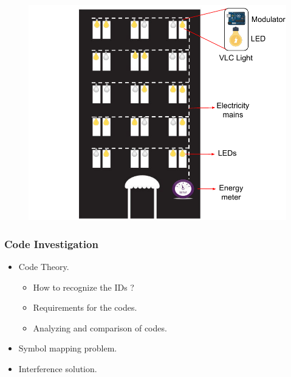 \documentclass{beamer}
\begin{document}
\begin{frame}
\begin{minipage}{.5\linewidth}
\begin{enumerate}
			\end{enumerate}
		\end{minipage}%
		\begin{minipage}{.5\linewidth}
			\begin{figure}
				\includegraphics[width=1.05\textwidth]{design.pdf}
			\end{figure}
		\end{minipage}

	\end{frame}



	\begin{frame}\frametitle{Code Investigation}

		\begin{itemize}

			\item Code Theory.
			\begin{itemize}

				\item How to recognize the IDs ?

				\item Requirements for the codes.

				\item Analyzing and comparison of codes.
			\end{itemize}

			\item Symbol mapping problem.

			\item Interference solution.

		\end{itemize}

	\end{frame}
\end{document}
